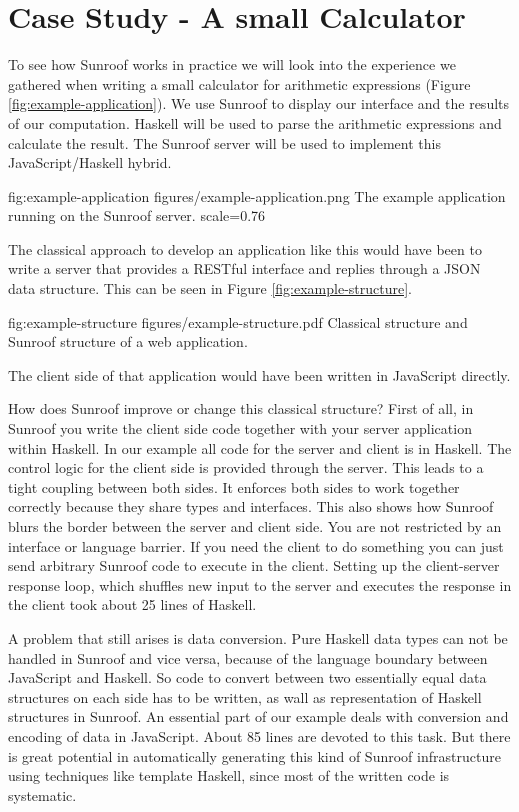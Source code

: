  
\section{Case Study - A small Calculator}
\label{sec:extended-example}

To see how Sunroof works in practice we will look into the 
experience we gathered when writing a small calculator
for arithmetic expressions (Figure \ref{fig:example-application}). 
We use Sunroof to display our interface
and the results of our computation. Haskell will be used to parse the 
arithmetic expressions and calculate the result. The Sunroof server 
will be used to implement this JavaScript/Haskell hybrid.

\FigureS%
{fig:example-application}%
{figures/example-application.png}%
{The example application running on the Sunroof server.}%
{scale=0.76}

The classical approach to develop an application like this would have 
been to write a server that provides a RESTful interface and replies 
through a JSON data structure. This can be seen in Figure 
\ref{fig:example-structure}.

\Figure%
{fig:example-structure}%
{figures/example-structure.pdf}%
{Classical structure and Sunroof structure of a web application.}

The client side of that application would have been written in JavaScript
directly.

How does Sunroof improve or change this classical structure?
First of all, in Sunroof you write the client side code together with
your server application within Haskell. In our example all code 
for the server and client is in Haskell. The control logic 
for the client side is provided through the server.
This leads to a tight coupling between both sides. 
It enforces both sides to work together
correctly because they share types and interfaces. 
This also shows how Sunroof blurs the border between the server 
and client side. You are not restricted by an interface or language 
barrier. If you need the client to do something you can just 
send arbitrary Sunroof code to execute in the client.
Setting up the client-server response loop, which shuffles 
new input to the server and executes the response in the client
took about 25 lines of Haskell.

A problem that still arises is data conversion. Pure Haskell data types
can not be handled in Sunroof and vice versa, because of the language
boundary between JavaScript and Haskell. So code to convert between two 
essentially equal data structures on each side has to be written,
as wall as representation of Haskell structures in Sunroof. An
essential part of our example deals with conversion and encoding of
data in JavaScript. About 85 lines are devoted to this task.
But there is great potential in automatically generating this
kind of Sunroof infrastructure using techniques like template Haskell,
since most of the written code is systematic.

